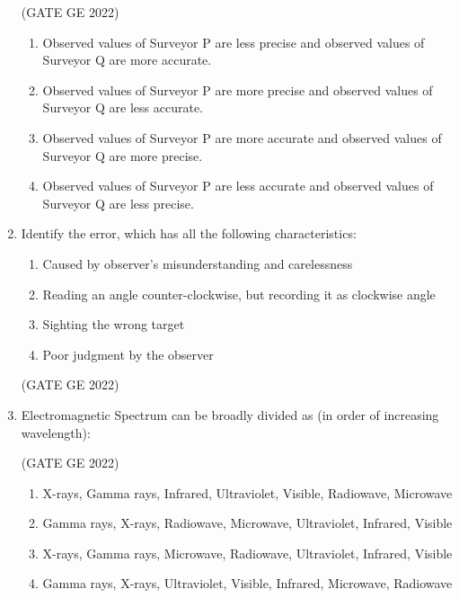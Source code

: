 \documentclass[journal,12pt,onecolumn]{IEEEtran}
\theoremstyle{remark}
\begin{document}
\begin{enumerate}
\hfill (GATE GE 2022)

\begin{enumerate}
    \item Observed values of Surveyor P are less precise and observed values of Surveyor Q are more accurate. 
    \item Observed values of Surveyor P are more precise and observed values of Surveyor Q are less accurate.
    \item Observed values of Surveyor P are more accurate and observed values of Surveyor Q are more precise.
    \item Observed values of Surveyor P are less accurate and observed values of Surveyor Q are less precise.
\end{enumerate}

\item Identify the error, which has all the following characteristics:
\begin{enumerate}[label=\arabic*)]
\item Caused by observer's misunderstanding and carelessness 
\item Reading an angle counter-clockwise, but recording it as clockwise angle 
\item Sighting the wrong target 
\item Poor judgment by the observer 
\end{enumerate}

\hfill (GATE GE 2022)

\begin{enumerate}
\end{enumerate}

\item Electromagnetic Spectrum can be broadly divided as (in order of increasing wavelength):

\hfill (GATE GE 2022)

\begin{enumerate}
    \item X-rays, Gamma rays, Infrared, Ultraviolet, Visible, Radiowave, Microwave
    \item Gamma rays, X-rays, Radiowave, Microwave, Ultraviolet, Infrared, Visible
    \item X-rays, Gamma rays, Microwave, Radiowave, Ultraviolet, Infrared, Visible
    \item Gamma rays, X-rays, Ultraviolet, Visible, Infrared, Microwave, Radiowave
\end{enumerate}


\end{enumerate}
\end{document}

